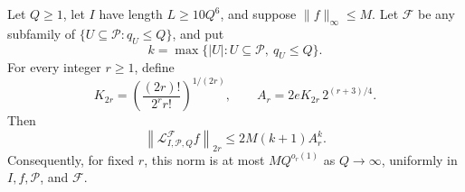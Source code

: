 \begin{lemma}
\label{lem:lift-moments}
Let \(Q\ge1\), let \(I\) have length \(L\ge10Q^6\), and suppose
\(\|f\|_\infty\le M\).  Let \(\mathcal F\) be any subfamily of
\(\{U\subseteq\mathcal P:q_U\le Q\}\), and put
\[
 k=\max\{|U|:U\subseteq\mathcal P,\ q_U\le Q\}.
\]
For every integer \(r\ge1\), define
\[
 K_{2r}=\left(\frac{(2r)!}{2^r r!}\right)^{1/(2r)},
 \qquad
 A_r=2eK_{2r}\,2^{(r+3)/4}.
\]
Then
\begin{equation}
 \left\|\mathcal L^{\mathcal F}_{I,\mathcal P,Q}f\right\|_{2r}
 \le 2M(k+1)A_r^k.
 \label{eq:lift-explicit-moment}
\end{equation}
Consequently, for fixed \(r\), this norm is at most \(M Q^{o_r(1)}\)
as \(Q\to\infty\), uniformly in \(I,f,\mathcal P\), and
\(\mathcal F\).
\end{lemma}

